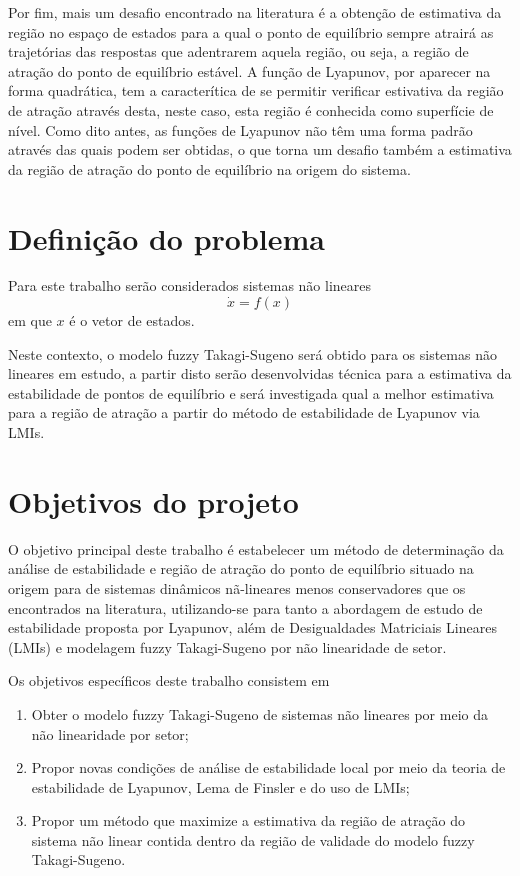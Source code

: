 Por fim, mais um desafio encontrado na literatura é a obtenção de estimativa da região no espaço de estados para a qual o ponto de equilíbrio sempre atrairá as trajetórias das respostas que adentrarem aquela região, ou seja, a região de atração do ponto de equilíbrio estável. A função de Lyapunov, por aparecer na forma quadrática, tem a caracterítica de se permitir verificar estivativa da região de atração através desta, neste caso, esta região é conhecida como superfície de nível. Como dito antes, as funções de Lyapunov não têm uma forma padrão através das quais podem ser obtidas, o que torna um desafio também a estimativa da região de atração do ponto de equilíbrio na origem do sistema.

\section{Definição do problema}

Para este trabalho serão considerados sistemas não lineares
\begin{equation}
\dot{x} = f(x)
\end{equation}
em que $x$ é o vetor de estados.

Neste contexto, o modelo fuzzy Takagi-Sugeno será obtido para os sistemas não lineares em estudo, a partir disto serão desenvolvidas técnica para a estimativa da estabilidade de pontos de equilíbrio e será investigada qual a melhor estimativa para a região de atração a partir do método de estabilidade de Lyapunov via LMIs.

\section{Objetivos do projeto}

O objetivo principal deste trabalho é estabelecer um método de determinação da análise de estabilidade e região de atração do ponto de equilíbrio situado na origem para de sistemas dinâmicos nã-lineares menos conservadores que os encontrados na literatura, utilizando-se para tanto a abordagem de estudo de estabilidade proposta por Lyapunov, além de Desigualdades Matriciais Lineares (LMIs) e modelagem fuzzy Takagi-Sugeno por não linearidade de setor.

Os objetivos específicos deste trabalho consistem em
\begin{enumerate}
\item Obter o modelo fuzzy Takagi-Sugeno de sistemas não lineares por meio da não linearidade por setor;
\item Propor novas condições de análise de estabilidade local por meio da teoria de estabilidade de Lyapunov, Lema de Finsler e do uso de LMIs;
\item Propor um método que maximize a estimativa da região de atração do sistema não linear contida dentro da região de validade do modelo fuzzy Takagi-Sugeno.
\end{enumerate}

